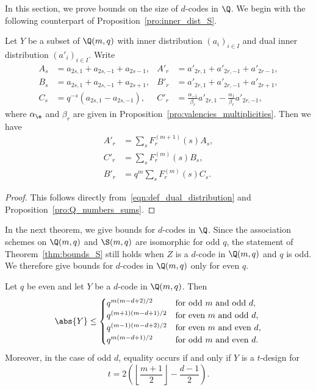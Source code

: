In this section, we prove bounds on the size of $d$-codes in $\Q$. We begin with the following counterpart of Proposition~\ref{pro:inner_dist_S}.
\begin{prop}
\label{pro:inner_dist_Q}
Let $Y$ be a subset of $\Q(m,q)$ with inner distribution $(a_i)_{i\in I}$ and dual inner distribution $(a'_i)_{i\in I}$. Write 
\begin{align*}
A_s&=a_{2s,1}+a_{2s,-1}+a_{2s-1}, & A'_r&=a'_{2r,1}+a'_{2r,-1}+a'_{2r-1},\\
B_s&=a_{2s,1}+a_{2s,-1}+a_{2s+1}, & B'_r&=a'_{2r,1}+a'_{2r,-1}+a'_{2r+1},\\
C_s&=q^{-s}(a_{2s,1}-a_{2s,-1}),  & C'_r&=\frac{\alpha_{-1}}{\beta_r}a'_{2r,1}-\frac{\alpha_{1}}{\beta_r}a'_{2r,-1},
\end{align*}
where $\alpha_\e$ and $\beta_r$ are given in Proposition~\ref{pro:valencies_multiplicities}. Then we have
\begin{align*}
A'_r&=\sum_sF^{(m+1)}_r(s)A_s,\\
C'_r&=\sum_sF^{(m)}_r(s)B_s,\\
B'_r&=q^m\sum_sF^{(m)}_r(s)C_s.
\end{align*}
\end{prop}
\begin{proof}
This follows directly from~\eqref{eqn:def_dual_distribution} and Proposition~\ref{pro:Q_numbers_sums}.
\end{proof}
\par
In the next theorem, we give bounds for $d$-codes in $\Q$. Since the association schemes on $\Q(m,q)$ and $\S(m,q)$ are isomorphic for odd $q$, the statement of Theorem~\ref{thm:bounds_S} still holds when $Z$ is a $d$-code in $\Q(m,q)$ and $q$ is odd. We therefore give bounds for $d$-codes in $\Q(m,q)$ only for even $q$.
\begin{theorem}
\label{thm:bound_Q}
Let $q$ be even and let $Y$ be a $d$-code in $\Q(m,q)$. Then
\[
\abs{Y}\le\begin{cases}
q^{m(m-d+2)/2}     & \text{for odd $m$ and odd $d$},\\
q^{(m+1)(m-d+1)/2} & \text{for even $m$ and odd $d$},\\
q^{(m-1)(m-d+2)/2} & \text{for even $m$ and even $d$},\\
q^{m(m-d+1)/2}     & \text{for odd $m$ and even $d$}.
\end{cases}
\]
Moreover, in the case of odd $d$, equality occurs if and only if $Y$ is a $t$-design for
\[
t=2\left(\left\lfloor\frac{m+1}{2}\right\rfloor-\frac{d-1}{2}\right).
\]
\end{theorem}
